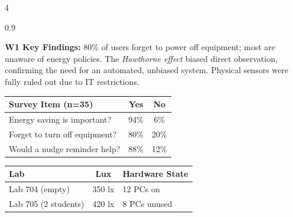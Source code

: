 \documentclass[a0,landscape]{a0poster}
\begin{document}
\begin{multicols}{4}
\begin{spacing}{0.9}
\vspace{0.2cm}
\begin{center}
\end{center}

\vspace{0.3cm}
{\large \textbf{W1 Key Findings:} 80\% of users forget to power off equipment; most are unaware of energy policies. The \textit{Hawthorne effect} biased direct observation, confirming the need for an automated, unbiased system. Physical sensors were fully ruled out due to IT restrictions.}

\vspace{0.3cm}
\begin{center}
{\large
\begin{tabular}{@{}p{9.5cm}cc@{}}
\toprule
\textbf{Survey Item} (n=35) & \textbf{Yes} & \textbf{No} \\
\midrule
Energy saving is important? & 94\% & 6\% \\
Forget to turn off equipment? & 80\% & 20\% \\
Would a nudge reminder help? & 88\% & 12\% \\
\bottomrule
\end{tabular}
}
\end{center}

\vspace{0.3cm}
\begin{center}
{\large
\begin{tabular}{@{}lcl@{}}
\toprule
\textbf{Lab} & \textbf{Lux} & \textbf{Hardware State} \\
\midrule
Lab 704 (empty) & 350 lx & 12 PCs on \\
Lab 705 (2 students) & 420 lx & 8 PCs unused \\
\bottomrule
\end{tabular}
}
\end{center}


\end{spacing}
\end{multicols}
\end{document}
